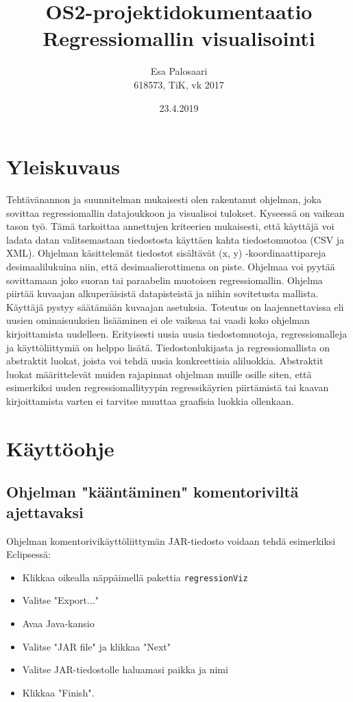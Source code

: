 \documentclass{article}
\title{OS2-projektidokumentaatio \\ Regressiomallin visualisointi}
\author{Esa Palosaari \\ 
        618573, TiK, vk 2017}
\date{23.4.2019}
\begin{document}
\maketitle

\section{Yleiskuvaus}

    Tehtävänannon ja suunnitelman mukaisesti olen rakentanut ohjelman, joka sovittaa 
	regressiomallin datajoukkoon ja visualisoi tulokset. Kyseessä on vaikean tason työ. 
	Tämä tarkoittaa annettujen kriteerien mukaisesti, että käyttäjä voi ladata datan 
	valitsemastaan tiedostosta käyttäen kahta tiedostomuotoa (CSV ja XML). Ohjelman 
	käsittelemät tiedostot sisältävät (x, y) -koordinaattipareja desimaalilukuina 
	niin, että desimaalierottimena on piste. Ohjelmaa voi pyytää sovittamaan joko 
	suoran tai paraabelin muotoisen regressiomallin. Ohjelma piirtää kuvaajan 
	alkuperäisistä datapisteistä ja niihin sovitetusta mallista. Käyttäjä pystyy 
	säätämään kuvaajan asetuksia. Toteutus on laajennettavissa eli uusien ominaisuuksien 
	lisääminen ei ole vaikeaa tai vaadi koko ohjelman kirjoittamista uudelleen. 
	Erityisesti uusia uusia tiedostomuotoja, regressiomalleja ja käyttöliittymiä on 
	helppo lisätä. Tiedostonlukijasta ja regressiomallista on abstraktit luokat, 
	joista voi tehdä uusia konkreettisia aliluokkia. Abstraktit luokat määrittelevät 
	muiden rajapinnat ohjelman muille osille siten, että esimerkiksi uuden 
	regressiomallityypin regressikäyrien piirtämistä tai kaavan kirjoittamista 
	varten ei tarvitse muuttaa graafisia luokkia ollenkaan.  

\section{Käyttöohje}
    \subsection{Ohjelman "kääntäminen" komentoriviltä ajettavaksi}
    Ohjelman komentorivikäyttöliittymän JAR-tiedosto voidaan tehdä esimerkiksi Eclipsessä:
    \begin{itemize}
        \item Klikkaa oikealla näppäimellä pakettia \texttt{regressionViz}
        \item Valitse "Export..."
        \item Avaa Java-kansio
        \item Valitse "JAR file" ja klikkaa "Next"
        \item Valitse JAR-tiedostolle haluamasi paikka ja nimi 
        \item Klikkaa "Finish". 
    \end{itemize}
\end{document}

